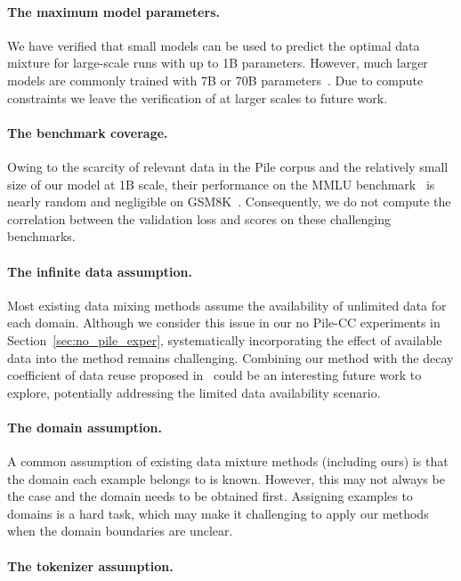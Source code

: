 \paragraph{The maximum model parameters.} We have verified that small models can be used to predict the optimal data mixture for large-scale runs with up to 1B parameters. However, much larger models are commonly trained with 7B or 70B parameters~\citep{llama2paper}. Due to compute constraints we leave the verification of \ourmethod at larger scales to future work.

\paragraph{The benchmark coverage.} Owing to the scarcity of relevant data in the Pile corpus and the relatively small size of our model at 1B scale, their performance on the MMLU benchmark~\citep{MMLU2021} is nearly random and negligible on GSM8K~\citep{gsm8k2021}. Consequently, we do not compute the correlation between the validation loss and scores on these challenging benchmarks.

\paragraph{The infinite data assumption.} Most existing data mixing methods assume the availability of unlimited data for each domain. Although we consider this issue in our no Pile-CC experiments in Section~\ref{sec:no_pile_exper}, systematically incorporating the effect of available data into the method remains challenging. Combining our method with the decay coefficient of data reuse proposed in~\citet{muennighoff2023scaling} could be an interesting future work to explore, potentially addressing the limited data availability scenario.

\paragraph{The domain assumption.} 

A common assumption of existing data mixture methods (including ours) is that the domain each example belongs to is known. However, this may not always be the case and the domain needs to be obtained first. Assigning examples to domains is a hard task, which may make it challenging to apply our methods when the domain boundaries are unclear.

\paragraph{The tokenizer assumption.}


